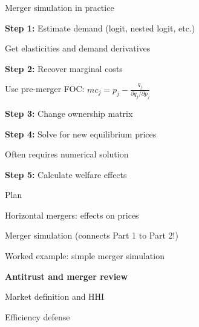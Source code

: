 \documentclass[notes,11pt, aspectratio=169]{beamer}
\newenvironment{wideitemize}{\itemize\addtolength{\itemsep}{10pt}}{\enditemize}
\newenvironment{wideenumerate}{\enumerate\addtolength{\itemsep}{10pt}}{\endenumerate}
\begin{document}
\begin{frame}{Merger simulation in practice}
	\begin{wideitemize}
		\item \textbf{Step 1:} Estimate demand (logit, nested logit, etc.)
		\begin{wideitemize}
			\vspace{5pt}
			\item Get elasticities and demand derivatives
		\end{wideitemize}
		\item \textbf{Step 2:} Recover marginal costs
		\begin{wideitemize}
			\vspace{5pt}
			\item Use pre-merger FOC: $mc_j = p_j - \frac{q_j}{\partial q_j / \partial p_j}$
		\end{wideitemize}
		\item \textbf{Step 3:} Change ownership matrix
		\item \textbf{Step 4:} Solve for new equilibrium prices
		\begin{wideitemize}
			\vspace{5pt}
			\item Often requires numerical solution
		\end{wideitemize}
		\item \textbf{Step 5:} Calculate welfare effects
	\end{wideitemize}
\end{frame}


\begin{frame}{Plan}
  \begin{wideenumerate}
    \item Horizontal mergers: effects on prices
    \item Merger simulation (connects Part 1 to Part 2!)
    \item Worked example: simple merger simulation
    \item \textbf{Antitrust and merger review}
    \item Market definition and HHI
    \item Efficiency defense
  \end{wideenumerate}
\end{frame}
\end{document}
